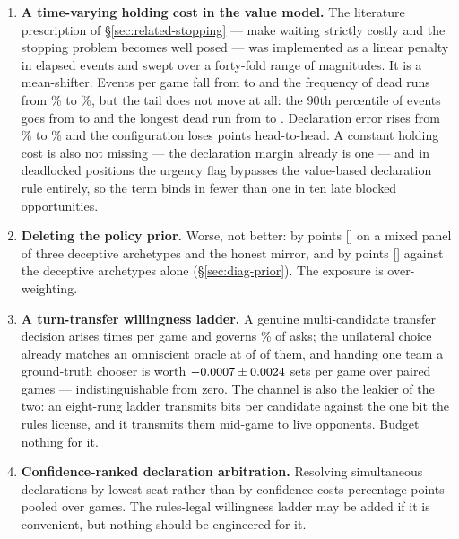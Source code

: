 \begin{enumerate}
  \item \textbf{A time-varying holding cost in the value model.} The literature
        prescription of \S\ref{sec:related-stopping} --- make waiting strictly
        costly and the stopping problem becomes well posed
        \cite{mguni-actioncost} --- was implemented as a linear penalty in
        elapsed events and swept over a forty-fold range of magnitudes. It is a
        mean-shifter. Events per game fall from \numHoldEventsBefore{} to
        \numHoldEventsAfter{} and the frequency of dead runs from
        \numHoldRunGamesBefore\% to \numHoldRunGamesAfter\%, but the tail does
        not move at all: the 90th percentile of events goes from
        \numHoldPninetyBefore{} to \numHoldPninetyAfter{} and the longest dead
        run from \numHoldLongestBefore{} to \numHoldLongestAfter{}. Declaration
        error rises from \numHoldDeclBefore\% to \numHoldDeclAfter\% and the
        configuration loses \numHoldLoss{} points head-to-head. A constant holding cost is
        also not missing --- the declaration margin already is one --- and in
        deadlocked positions the urgency flag bypasses the value-based
        declaration rule entirely, so the term binds in fewer than one in ten
        late blocked opportunities.
  \item \textbf{Deleting the policy prior.} Worse, not better: by
        \numAgnosticCost{} points [\numAgnosticCI] on a mixed panel of three
        deceptive archetypes and the honest mirror, and by
        \numPriorDeleteCost{} points [\numPriorDeleteCI] against the deceptive
        archetypes alone (\S\ref{sec:diag-prior}). The exposure is
        over-weighting.
  \item \textbf{A turn-transfer willingness ladder.} A genuine multi-candidate
        transfer decision arises \numTransferRate{} times per game and governs
        \numTransferAskShare\% of asks; the unilateral choice already matches an omniscient
        oracle at \numTransferOracle{} of \numTransferOracleN{} of them, and
        handing one team a ground-truth chooser is worth
        $-0.0007 \pm 0.0024$ sets per game over \numTransferGames{}
        paired games --- indistinguishable from zero. The channel is also the leakier of
        the two: an eight-rung ladder transmits \numLadderLeak{} bits per
        candidate against the one bit the rules license, and it transmits them
        mid-game to live opponents. Budget nothing for it.
  \item \textbf{Confidence-ranked declaration arbitration.} Resolving
        simultaneous declarations by lowest seat rather than by confidence costs
        \numArbCost{} percentage points pooled over \numArbGames{} games. The
        rules-legal willingness ladder may be added if it is convenient, but
        nothing should be engineered for it.
\end{enumerate}
